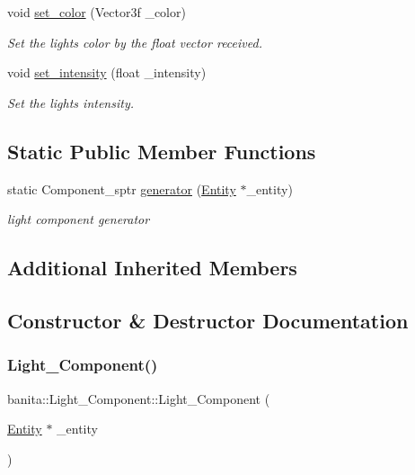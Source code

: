 \begin{DoxyCompactItemize}
void \mbox{\hyperlink{classbanita_1_1_light___component_ad6e5bef3588a571ef6390476fc9c1d42}{set\+\_\+color}} (Vector3f \+\_\+color)
\begin{DoxyCompactList}\small\item\em Set the light\textquotesingle{}s color by the float vector received. \end{DoxyCompactList}\item 
void \mbox{\hyperlink{classbanita_1_1_light___component_a54164691efbc95979cb869910b4f34fd}{set\+\_\+intensity}} (float \+\_\+intensity)
\begin{DoxyCompactList}\small\item\em Set the light\textquotesingle{}s intensity. \end{DoxyCompactList}\end{DoxyCompactItemize}
\subsection*{Static Public Member Functions}
\begin{DoxyCompactItemize}
\item 
static Component\+\_\+sptr \mbox{\hyperlink{classbanita_1_1_light___component_acc13089b837daf1b1751c3dca81fa798}{generator}} (\mbox{\hyperlink{classbanita_1_1_entity}{Entity}} $\ast$\+\_\+entity)
\begin{DoxyCompactList}\small\item\em light component generator \end{DoxyCompactList}\end{DoxyCompactItemize}
\subsection*{Additional Inherited Members}


\subsection{Constructor \& Destructor Documentation}
\mbox{\label{classbanita_1_1_light___component_ab3a24d9ee4cd5d3598588dabef05375b}} 
\subsubsection{\texorpdfstring{Light\_Component()}{Light\_Component()}}
{\footnotesize\ttfamily banita\+::\+Light\+\_\+\+Component\+::\+Light\+\_\+\+Component (\begin{DoxyParamCaption}\item[{\mbox{\hyperlink{classbanita_1_1_entity}{Entity}} $\ast$}]{\+\_\+entity }\end{DoxyParamCaption})}




